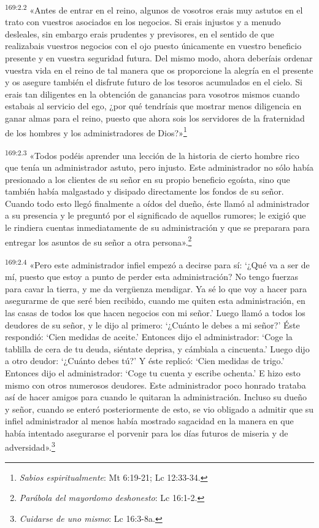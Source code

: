 \par 
\textsuperscript{169:2.2} «Antes de entrar en el reino, algunos de vosotros erais muy astutos en el trato con vuestros asociados en los negocios. Si erais injustos y a menudo desleales, sin embargo erais prudentes y previsores, en el sentido de que realizabais vuestros negocios con el ojo puesto únicamente en vuestro beneficio presente y en vuestra seguridad futura. Del mismo modo, ahora deberíais ordenar vuestra vida en el reino de tal manera que os proporcione la alegría en el presente y os asegure también el disfrute futuro de los tesoros acumulados en el cielo. Si erais tan diligentes en la obtención de ganancias para vosotros mismos cuando estabais al servicio del ego, ¿por qué tendríais que mostrar menos diligencia en ganar almas para el reino, puesto que ahora sois los servidores de la fraternidad de los hombres y los administradores de Dios?»\footnote{\textit{Sabios espiritualmente}: Mt 6:19-21; Lc 12:33-34.}

\par 
\textsuperscript{169:2.3} «Todos podéis aprender una lección de la historia de cierto hombre rico que tenía un administrador astuto, pero injusto. Este administrador no sólo había presionado a los clientes de su señor en su propio beneficio egoísta, sino que también había malgastado y disipado directamente los fondos de su señor. Cuando todo esto llegó finalmente a oídos del dueño, éste llamó al administrador a su presencia y le preguntó por el significado de aquellos rumores; le exigió que le rindiera cuentas inmediatamente de su administración y que se preparara para entregar los asuntos de su señor a otra persona».\footnote{\textit{Parábola del mayordomo deshonesto}: Lc 16:1-2.}

\par 
\textsuperscript{169:2.4} «Pero este administrador infiel empezó a decirse para sí: `¿Qué va a ser de mí, puesto que estoy a punto de perder esta administración? No tengo fuerzas para cavar la tierra, y me da verg\"uenza mendigar. Ya sé lo que voy a hacer para asegurarme de que seré bien recibido, cuando me quiten esta administración, en las casas de todos los que hacen negocios con mi señor.' Luego llamó a todos los deudores de su señor, y le dijo al primero: `¿Cuánto le debes a mi señor?' Éste respondió: `Cien medidas de aceite.' Entonces dijo el administrador: `Coge la tablilla de cera de tu deuda, siéntate deprisa, y cámbiala a cincuenta.' Luego dijo a otro deudor: `¿Cuánto debes tú?' Y éste replicó: `Cien medidas de trigo.' Entonces dijo el administrador: `Coge tu cuenta y escribe ochenta.' E hizo esto mismo con otros numerosos deudores. Este administrador poco honrado trataba así de hacer amigos para cuando le quitaran la administración. Incluso su dueño y señor, cuando se enteró posteriormente de esto, se vio obligado a admitir que su infiel administrador al menos había mostrado sagacidad en la manera en que había intentado asegurarse el porvenir para los días futuros de miseria y de adversidad».\footnote{\textit{Cuidarse de uno mismo}: Lc 16:3-8a.}

